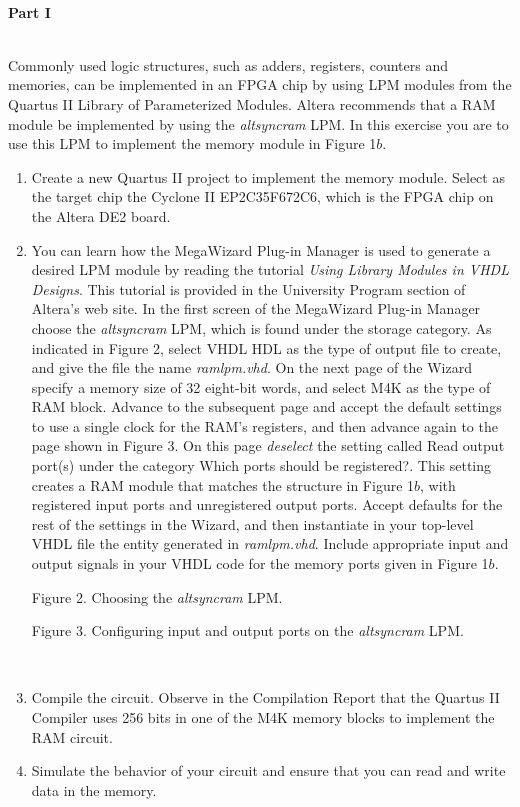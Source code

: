 \documentclass[psfig,10pt,fullpage]{article}
\begin{document}
~\\
\noindent
{\bf Part I}

~\\
\noindent
Commonly used logic structures, such as adders, registers, counters and memories, 
can be implemented in an FPGA chip by using LPM modules from the Quartus II
Library of Parameterized Modules. Altera recommends that a 
RAM module be implemented by using the {\it altsyncram} LPM. In this exercise you are to
use this LPM to implement the memory module in Figure 1$b$.

\begin{enumerate}
\item Create a new Quartus II project to implement the memory module.
Select as the target chip the Cyclone II EP2C35F672C6, which is the FPGA chip on the 
Altera DE2 board.

\item You can learn how the MegaWizard Plug-in Manager is used to generate a desired 
LPM module by reading the tutorial {\it Using Library Modules in VHDL Designs}. This 
tutorial is provided in the University Program section of Altera's web site.
In the first screen of the MegaWizard Plug-in Manager choose the 
{\it altsyncram} LPM, which is found under the {\sf storage} category. As indicated in Figure 2,
select {\sf VHDL HDL} as the type of output file to create, and give the file the
name {\it ramlpm.vhd}. On the next page of the Wizard specify a memory size of 32 eight-bit 
words, and select M4K as the type of RAM block. Advance to the subsequent page and
accept the default settings to use a single clock for the RAM's registers, 
and then advance again to 
the page shown in Figure 3. On this page {\it deselect} the setting called {\sf Read
output port(s)} under the category {\sf Which ports should be registered?}. This setting
creates a RAM module that matches the structure in Figure 1$b$, with registered input
ports and unregistered output ports. Accept defaults for the rest of the settings in the
Wizard, and then instantiate in your top-level VHDL file the entity generated in 
{\it ramlpm.vhd}. Include appropriate input and output signals in your VHDL code for the
memory ports given in Figure 1$b$.

\begin{figure}[H]
\scriptsize
\centerline{
\hbox{}}
\end{figure}
\centerline{Figure 2.  Choosing the {\it altsyncram} LPM.}

\begin{figure}[H]
\scriptsize
\centerline{
\hbox{}}
\end{figure}
\centerline{Figure 3.  Configuring input and output ports on the {\it altsyncram} LPM.}
~\\
\item Compile the circuit. Observe in the Compilation Report that the Quartus II 
Compiler uses 256 bits in one of the M4K memory blocks to implement the RAM circuit.
\item Simulate the behavior of your circuit and ensure that you can read and write data in
the memory.
\end{enumerate}
\end{document}
